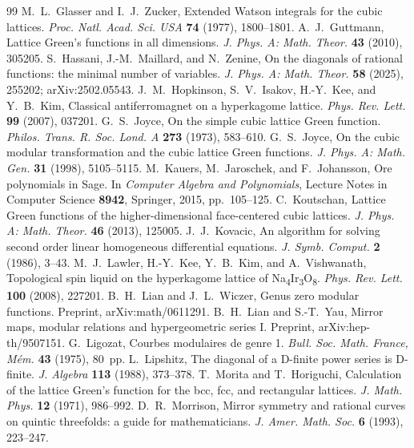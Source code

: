 \documentclass[11pt]{article}
\theoremstyle{plain}
\theoremstyle{remark}
\begin{document}
\begin{thebibliography}{99}
 M.~L.~Glasser and I.~J.~Zucker, Extended Watson integrals for the cubic lattices. \textit{Proc. Natl. Acad. Sci. USA} \textbf{74} (1977), 1800--1801.
 A.~J.~Guttmann, Lattice Green's functions in all dimensions. \textit{J. Phys. A: Math. Theor.} \textbf{43} (2010), 305205.
 S.~Hassani, J.-M.~Maillard, and N.~Zenine, On the diagonals of rational functions: the minimal number of variables. \textit{J. Phys. A: Math. Theor.} \textbf{58} (2025), 255202; arXiv:2502.05543.
 J.~M.~Hopkinson, S.~V.~Isakov, H.-Y.~Kee, and Y.~B.~Kim, Classical antiferromagnet on a hyperkagome lattice. \textit{Phys. Rev. Lett.} \textbf{99} (2007), 037201.
 G.~S.~Joyce, On the simple cubic lattice Green function. \textit{Philos. Trans. R. Soc. Lond. A} \textbf{273} (1973), 583--610.
 G.~S.~Joyce, On the cubic modular transformation and the cubic lattice Green functions. \textit{J. Phys. A: Math. Gen.} \textbf{31} (1998), 5105--5115.
 M.~Kauers, M.~Jaroschek, and F.~Johansson, Ore polynomials in Sage. In \textit{Computer Algebra and Polynomials}, Lecture Notes in Computer Science \textbf{8942}, Springer, 2015, pp.~105--125.
 C.~Koutschan, Lattice Green functions of the higher-dimensional face-centered cubic lattices. \textit{J. Phys. A: Math. Theor.} \textbf{46} (2013), 125005.
 J.~J.~Kovacic, An algorithm for solving second order linear homogeneous differential equations. \textit{J. Symb. Comput.} \textbf{2} (1986), 3--43.
 M.~J.~Lawler, H.-Y.~Kee, Y.~B.~Kim, and A.~Vishwanath, Topological spin liquid on the hyperkagome lattice of Na\textsubscript{4}Ir\textsubscript{3}O\textsubscript{8}. \textit{Phys. Rev. Lett.} \textbf{100} (2008), 227201.
 B.~H.~Lian and J.~L.~Wiczer, Genus zero modular functions. Preprint, arXiv:math/0611291.
 B.~H.~Lian and S.-T.~Yau, Mirror maps, modular relations and hypergeometric series I. Preprint, arXiv:hep-th/9507151.
 G.~Ligozat, Courbes modulaires de genre 1. \textit{Bull. Soc. Math. France, M\'em.} \textbf{43} (1975), 80~pp.
 L.~Lipshitz, The diagonal of a D-finite power series is D-finite. \textit{J. Algebra} \textbf{113} (1988), 373--378.
 T.~Morita and T.~Horiguchi, Calculation of the lattice Green's function for the bcc, fcc, and rectangular lattices. \textit{J. Math. Phys.} \textbf{12} (1971), 986--992.
 D.~R.~Morrison, Mirror symmetry and rational curves on quintic threefolds: a guide for mathematicians. \textit{J. Amer. Math. Soc.} \textbf{6} (1993), 223--247.

\end{thebibliography}
\end{document}
